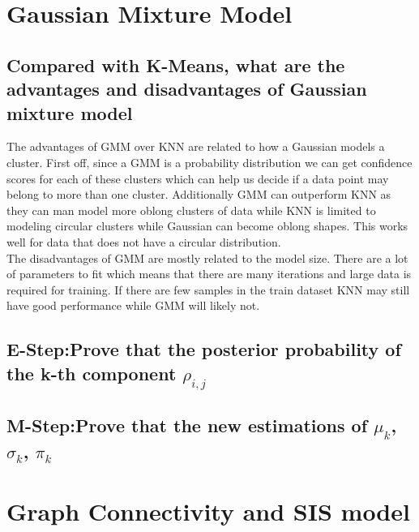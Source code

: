 \documentclass[11pt]{article}
\begin{document}
\section{Gaussian Mixture Model}
\subsection{Compared with K-Means, what are the advantages and disadvantages of Gaussian mixture model}
The advantages of GMM over KNN are related to how a Gaussian models a cluster. First off, since a GMM is a probability distribution we can get confidence scores for each of these clusters which can help us decide if a data point may belong to more than one cluster. Additionally GMM can outperform KNN as they can man model more oblong clusters of data while KNN is limited to modeling circular clusters while Gaussian can become oblong shapes. This works well for data that does not have a circular distribution.  \\

The disadvantages of GMM are mostly related to the model size. There are a lot of parameters to fit which means that there are many iterations and large data is required for training. If there are few samples in the train dataset KNN may still have good performance while GMM will likely not.
\subsection{E-Step:Prove that the posterior probability of the k-th component $\rho_{i,j}$}
\subsection{M-Step:Prove that the new estimations of $\mu_k$, $\sigma_k$, $\pi_k$}
\section{Graph Connectivity and SIS model}
\end{document}
